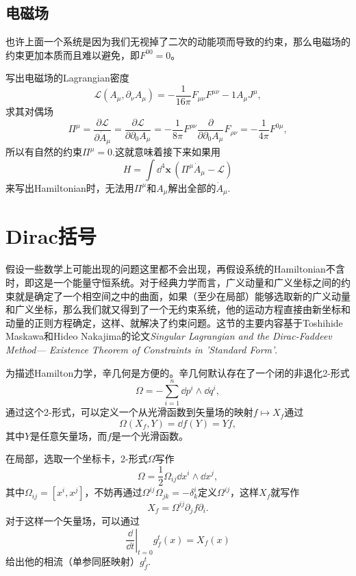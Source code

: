\subsection*{电磁场}
也许上面一个系统是因为我们无视掉了二次的动能项而导致的约束，那么电磁场的约束更加本质而且难以避免，即$F^{00}=0$。

写出电磁场的Lagrangian密度
\[
	\mathcal{L}(A_\mu,\partial_\nu A_\mu)=-\frac{1}{16\pi}F_{\mu\nu}F^{\mu\nu}-1A_\mu J^\mu,
\]
求其对偶场
\[
	\Pi^\mu=\frac{\partial \mathcal{L}}{\partial \dot A_\mu}=\frac{\partial \mathcal{L}}{\partial \partial_0A_\mu}=-\frac{1}{8\pi}F^{\rho\nu}\frac{\partial}{\partial \partial_0A_\mu}F_{\rho\nu}=-\frac{1}{4\pi}F^{0\mu},
\]
所以有自然的约束$\Pi^\mu=0$.这就意味着接下来如果用
\[
	H=\int\dd^4 \bm{x}\, \left(\Pi^\mu\dot{A}_\mu-\mathcal{L}\right)
\]
来写出Hamiltonian时，无法用$\Pi^\mu$和$A_\mu$解出全部的$\dot{A}_\mu$.

\section{Dirac括号}
假设一些数学上可能出现的问题这里都不会出现，再假设系统的Hamiltonian不含时，即这是一个能量守恒系统。对于经典力学而言，广义动量和广义坐标之间的约束就是确定了一个相空间之中的曲面，如果（至少在局部）能够选取新的广义动量和广义坐标，那么我们就又得到了一个无约束系统，他的运动方程直接由新坐标和动量的正则方程确定，这样、就解决了约束问题。这节的主要内容基于Toshihide Maskawa和Hideo Nakajima的论文\emph{Singular Lagrangian and the Dirac-Faddeev Method---
Existence Theorem of Constraints in 'Standard Form'}.

为描述Hamilton力学，辛几何是方便的。辛几何默认存在了一个闭的非退化2-形式
\begin{equation}
	\Omega=-\sum_{i=1}^n\dd p^i\wedge \dd q^i,
\end{equation}
通过这个2-形式，可以定义一个从光滑函数到矢量场的映射$f\mapsto X_f$通过
\begin{equation}
	\Omega(X_f,Y)=\dd f(Y)=Yf,
	\label{s2:1}
\end{equation}
其中$Y$是任意矢量场，而$f$是一个光滑函数。

在局部，选取一个坐标卡，2-形式$\Omega$写作
\[
	\Omega=\frac{1}{2}\Omega_{ij} \dd x^i\wedge \dd x^j,
\]
其中$\Omega_{ij}=[x^i,x^j]$，不妨再通过$\Omega^{ij}\Omega_{jk}=-\delta^i_k$定义$\Omega^{ij}$，这样$X_f$就写作
\[
	X_f=\Omega^{ij}\partial_j f\partial_i.
\]
对于这样一个矢量场，可以通过
\[
	\left.\frac{\dd }{\dd t}\right|_{t=0}g_f^t(x)=X_f(x)
\]
给出他的相流（单参同胚映射）$g_f^t$.

